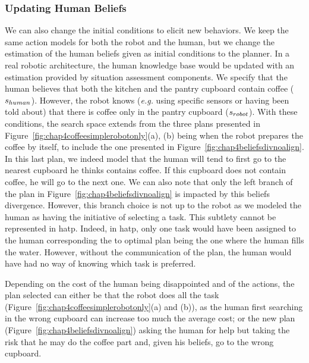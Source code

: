 \documentclass[a4paper,11pt,twoside]{StyleThese}
\begin{document}
\subsubsection{Updating Human Beliefs}
We can also change the initial conditions to elicit new behaviors. We keep the same action models for both the robot and the human, but we change the estimation of the human beliefs given as initial conditions to the planner. In a real robotic architecture, the human knowledge base would be updated with an estimation provided by situation assessment components. We specify that the human believes that both the kitchen and the pantry cupboard contain coffee ($s_{human}$). However, the robot knows (\textit{e.g.} using specific sensors or having been told about) that there is coffee only in the pantry cupboard ($s_{robot}$). With these conditions, the search space extends from the three plans presented in Figure~\ref{fig:chap4coffeesimplerobotonly}(a), (b) being when the robot prepares the coffee by itself, to include the one presented in Figure~\ref{fig:chap4beliefsdivnoalign}. In this last plan, we indeed model that the human will tend to first go to the nearest cupboard he thinks contains coffee. If this cupboard does not contain coffee, he will go to the next one. We can also note that only the left branch of the plan in Figure~\ref{fig:chap4beliefsdivnoalign} is impacted by this beliefs divergence. However, this branch choice is not up to the robot as we modeled the human as having the initiative of selecting a task. This subtlety cannot be represented in \acrshort{hatp}. Indeed, in \acrshort{hatp}, only one task would have been assigned to the human corresponding the to optimal plan being the one where the human fills the water. However, without the communication of the plan, the human would have had no way of knowing which task is preferred.

Depending on the cost of the human being disappointed and of the actions, the plan selected can either be that the robot does all the task (Figure~\ref{fig:chap4coffeesimplerobotonly}(a) and (b)), as the human first searching in the wrong cupboard can increase too much the average cost; or the new plan (Figure~\ref{fig:chap4beliefsdivnoalign}) asking the human for help but taking the risk that he may do the coffee part and, given his beliefs, go to the wrong cupboard.
\end{document}
